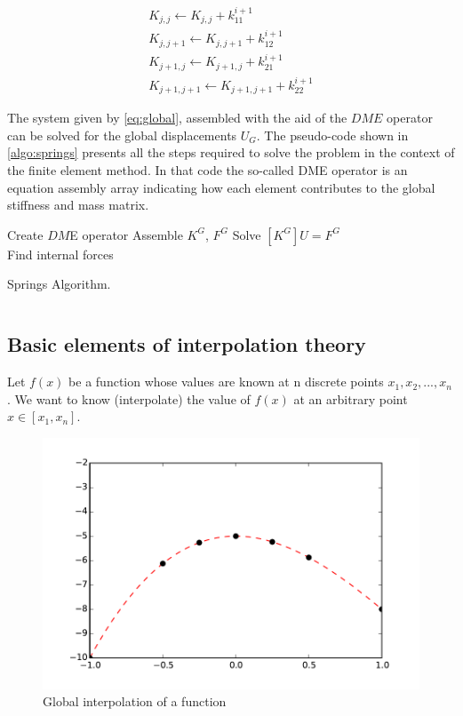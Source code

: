 \[\begin{array}{l}
{K_{j,j}} \leftarrow {K_{j,j}} + k_{11}^{i + 1}\\
{K_{j,j + 1}} \leftarrow {K_{j,j + 1}} + k_{12}^{i + 1}\\
{K_{j + 1,j}} \leftarrow {K_{j + 1,j}} + k_{21}^{i + 1}\\
{K_{j + 1,j + 1}} \leftarrow {K_{j + 1,j + 1}} + k_{22}^{i + 1}
\end{array}\]

The system given by \cref{eq:global}, assembled with the aid of the $DME$ operator can be solved for the global displacements $U_G$. The pseudo-code shown in \cref{algo:springs} presents all the steps required to solve the problem in the context of the finite element method. In that code the so-called DME operator is an equation assembly array indicating how each element contributes to the global stiffness and mass matrix.

\begin{algorithm}[H]\label{algo:springs}
    \SetAlgoLined
    Create $DM$E operator\;
    Assemble $K^G$, $F^G$\;
    Solve $[K^G]U=F^G$\\
    Find internal forces
    \caption{Springs Algorithm.}    
\end{algorithm}

\newpage

\inputminted[]{python}{src/engine.py}

\newpage


\subsection{Basic elements of interpolation theory}
Let $f(x)$ be a function whose values are known at n discrete points ${x_1, x_2,...,x_n}$. We want to know (interpolate) the value of $f(x)$ at an arbitrary point $x \in \left[ {{x_1},{x_n}} \right]$.

\begin{figure}[h]
\centering
\includegraphics[width=12cm]{img/interpol1.pdf}
\caption{Global interpolation of a function}
\label{fig:interpol1}
\end{figure}

